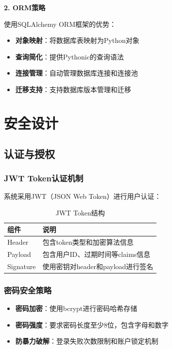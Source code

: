 \documentclass[a4paper]{article}
\begin{document}
\textbf{2. ORM策略}

使用SQLAlchemy ORM框架的优势：

\begin{itemize}
    \item \textbf{对象映射}：将数据库表映射为Python对象
    \item \textbf{查询简化}：提供Pythonic的查询语法
    \item \textbf{连接管理}：自动管理数据库连接和连接池
    \item \textbf{迁移支持}：支持数据库版本管理和迁移
\end{itemize}

\section{安全设计}

\subsection{认证与授权}

\subsubsection{JWT Token认证机制}

系统采用JWT（JSON Web Token）进行用户认证：

\begin{table}[H]
\centering
\begin{tabular}{|l|p{10cm}|}
\hline
\textbf{组件} & \textbf{说明} \\
\hline
Header & 包含token类型和加密算法信息 \\
\hline
Payload & 包含用户ID、过期时间等claims信息 \\
\hline
Signature & 使用密钥对header和payload进行签名 \\
\hline
\end{tabular}
\caption{JWT Token结构}
\end{table}

\subsubsection{密码安全策略}

\begin{itemize}
    \item \textbf{密码加密}：使用bcrypt进行密码哈希存储
    \item \textbf{密码强度}：要求密码长度至少8位，包含字母和数字
    \item \textbf{防暴力破解}：登录失败次数限制和账户锁定机制
\end{itemize}
\end{document}
